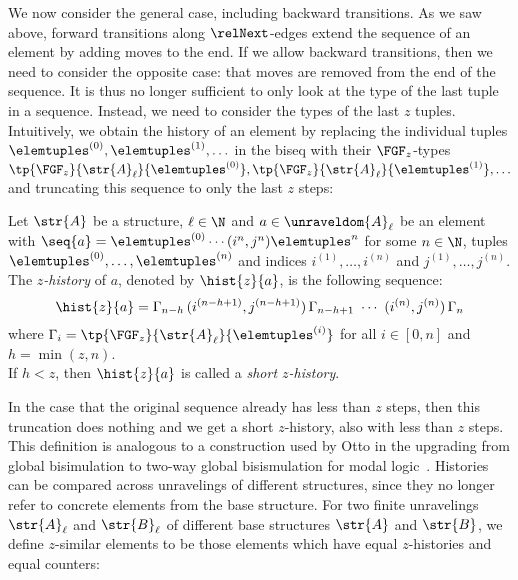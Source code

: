 We now consider the general case, including backward transitions.
As we saw above, forward transitions along $\relNext$-edges extend the sequence of an element by adding moves to the end.
If we allow backward transitions, then we need to consider the opposite case: that moves are removed from the end of the sequence.
It is thus no longer sufficient to only look at the type of the last tuple in a sequence.
Instead, we need to consider the types of the last $z$ tuples.
Intuitively, we obtain the history of an element by replacing the individual tuples $\elemtuples^{(0)}, \elemtuples^{(1)}, \ldots$ in the biseq with their $\FGF_{z}$-types $\tp{\FGF_{z}}{\str{A}_{\ell}}{\elemtuples^{(0)}}, \tp{\FGF_{z}}{\str{A}_{\ell}}{\elemtuples^{(1)}}, \ldots$ and truncating this sequence to only the last $z$ steps:
\begin{definition}[$z$-history]
  Let $\str{A}$ be a structure, $\ell \in \N$ and $a \in \unraveldom{A}_{\ell}$ be an element with $\seq{a} = \elemtuples^{(0)} \cdots (i^{n}, j^{n})\elemtuples^{n}$ for some $n \in \N$, tuples $\elemtuples^{(0)}, \ldots, \elemtuples^{(n)}$ and indices $i^{(1)}, \ldots, i^{(n)}$ and $j^{(1)}, \ldots, j^{(n)}$.\\
  The \emph{$z$-history} of $a$, denoted by $\hist{z}{a}$, is the following sequence:
  \begin{equation*}
    \hist{z}{a} =
      \Gamma_{n-h}
      \,
      (i^{(n-h+1)}, j^{(n-h+1)})
      \,
      \Gamma_{n-h+1}
      \
      \cdots
      \
      (i^{(n)}, j^{(n)})
      \,
      \Gamma_{n}
  \end{equation*}
  where $\Gamma_{i} = \tp{\FGF_{z}}{\str{A}_{\ell}}{\elemtuples^{(i)}}$ for all $i \in [0,n]$ and $h = \min(z, n)$. \\
  If $h < z$, then $\hist{z}{a}$ is called a \emph{short $z$-history}.
\end{definition}
In the case that the original sequence already has less than $z$ steps, then this truncation does nothing and we get a short $z$-history, also with less than $z$ steps.
This definition is analogous to a construction used by Otto in the upgrading from global bisimulation to two-way global bisismulation for modal logic~\cite[Def. 39]{Otto04}.
Histories can be compared across unravelings of different structures, since they no longer refer to concrete elements from the base structure.
For two finite unravelings $\str{A}_{\ell}$ and $\str{B}_{\ell}$ of different base structures $\str{A}$ and $\str{B}$, we define $z$-similar elements to be those elements which have equal $z$-histories and equal counters:
